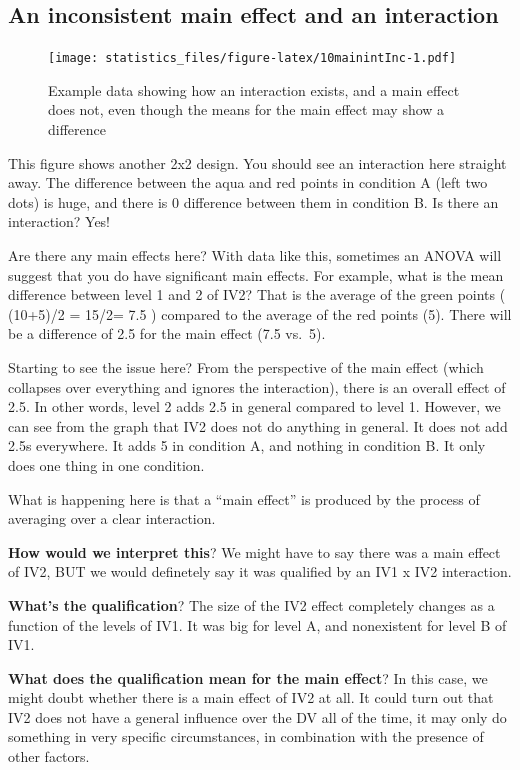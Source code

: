\documentclass[]{book}
\begin{document}
\hypertarget{an-inconsistent-main-effect-and-an-interaction}{%
\subsection{An inconsistent main effect and an interaction}\label{an-inconsistent-main-effect-and-an-interaction}}

\begin{figure}
\centering
\texttt{[image: statistics\_files/figure-latex/10mainintInc-1.pdf]}
\caption{\label{fig:10mainintInc}Example data showing how an interaction exists, and a main effect does not, even though the means for the main effect may show a difference}
\end{figure}

This figure shows another 2x2 design. You should see an interaction here straight away. The difference between the aqua and red points in condition A (left two dots) is huge, and there is 0 difference between them in condition B. Is there an interaction? Yes!

Are there any main effects here? With data like this, sometimes an ANOVA will suggest that you do have significant main effects. For example, what is the mean difference between level 1 and 2 of IV2? That is the average of the green points ( (10+5)/2 = 15/2= 7.5 ) compared to the average of the red points (5). There will be a difference of 2.5 for the main effect (7.5 vs.~5).

Starting to see the issue here? From the perspective of the main effect (which collapses over everything and ignores the interaction), there is an overall effect of 2.5. In other words, level 2 adds 2.5 in general compared to level 1. However, we can see from the graph that IV2 does not do anything in general. It does not add 2.5s everywhere. It adds 5 in condition A, and nothing in condition B. It only does one thing in one condition.

What is happening here is that a ``main effect'' is produced by the process of averaging over a clear interaction.

\textbf{How would we interpret this}? We might have to say there was a main effect of IV2, BUT we would definetely say it was qualified by an IV1 x IV2 interaction.

\textbf{What's the qualification}? The size of the IV2 effect completely changes as a function of the levels of IV1. It was big for level A, and nonexistent for level B of IV1.

\textbf{What does the qualification mean for the main effect}? In this case, we might doubt whether there is a main effect of IV2 at all. It could turn out that IV2 does not have a general influence over the DV all of the time, it may only do something in very specific circumstances, in combination with the presence of other factors.
\end{document}
